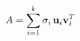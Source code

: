 \documentclass[preview]{standalone}
\begin{document}
\begin{align*}
\special{dvisvgm:raw <g id='unique000'>} A = \sum_{i=1}^{k} \sigma_i \, \mathbf{u}_i \mathbf{v}_i^T \special{dvisvgm:raw </g>}
\end{align*}
\end{document}

